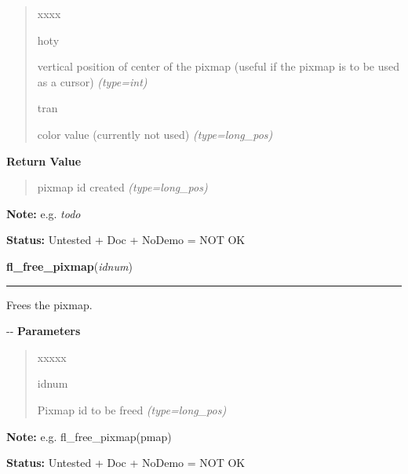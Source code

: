 \begin{boxedminipage}{\funcwidth}
\begin{quote}
\begin{Ventry}{xxxx}
          \item[hoty]


vertical position of center of the pixmap (useful if the pixmap is
to be used as a cursor)
            {\it (type=int)}

          \item[tran]


color value (currently not used)
            {\it (type=long\_pos)}

        \end{Ventry}

      \end{quote}

      \textbf{Return Value}
    \vspace{-1ex}

      \begin{quote}

pixmap id created
      {\it (type=long\_pos)}

      \end{quote}

\textbf{Note:} 
e.g. \emph{todo}


\textbf{Status:} 
Untested + Doc + NoDemo = NOT OK


    \end{boxedminipage}

    \label{xformslib:flbitmap:fl_free_pixmap}

    \vspace{0.5ex}

\hspace{.8\funcindent}\begin{boxedminipage}{\funcwidth}

    \raggedright \textbf{fl\_free\_pixmap}(\textit{idnum})

    \vspace{-1.5ex}

    \rule{\textwidth}{0.5\fboxrule}
\setlength{\parskip}{2ex}

Frees the pixmap.

-{}-
\setlength{\parskip}{1ex}
      \textbf{Parameters}
      \vspace{-1ex}

      \begin{quote}
        \begin{Ventry}{xxxxx}

          \item[idnum]


Pixmap id to be freed
            {\it (type=long\_pos)}

        \end{Ventry}

      \end{quote}

\textbf{Note:} 
e.g. fl\_free\_pixmap(pmap)


\textbf{Status:} 
Untested + Doc + NoDemo = NOT OK


    \end{boxedminipage}


